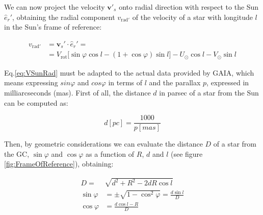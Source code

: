 \noindent 
We can now project the velocity $\bm{v'}_s$ onto radial direction with respect to the Sun $\hat{e}_r'$,
obtaining the radial component $v_{\text{rad}'}$ of the velocity of a star with longitude $l$ in the Sun's frame of reference:

\begin{equation}\label{eq:VSunRad}
    \begin{aligned}
        v_{\text{rad}'}  &= \bm{v}_s' \cdot \hat{e}_r' = \\ 
        &=V_{\text{rot}} \biggl[ \sin\varphi \cos l - (1 + \cos\varphi)\sin l \biggr] - U_{\odot} \cos l - V_{\odot} \sin l
    \end{aligned}
\end{equation}
\noindent

Eq.\ref{eq:VSunRad} must be adapted to the actual data provided by GAIA, which means expressing $sin\varphi$ and $cos\varphi$ in terms of $l$ and the parallax $p$, expressed in milliarcseconds (\unit{mas}). First of all, the distance $d$ in parsec of a star from the Sun can be computed as:

\begin{equation}\label{eq:DistanceParallax}
    d[\unit{pc}] = \frac{1000}{p[\unit{mas}]}
\end{equation}

\noindent
Then, by geometric considerations we can evaluate the distance $D$ of a star from the GC, $\sin\varphi$ and $\cos\varphi$ as a function of $R$, $d$ and $l$ (see figure \ref{fig:FrameOfReference}), obtaining:

\begin{equation}\label{eq:Geometry}
    \begin{aligned}
        D=&\sqrt{d^2 + R^2 - 2dR \cos l} \\
        \sin\varphi &= \pm \sqrt{1 - \cos^2 \varphi} = \frac{d\sin l}{D}\\
        \cos\varphi &= \frac{d \cos l - R}{D}
    \end{aligned}
\end{equation}

